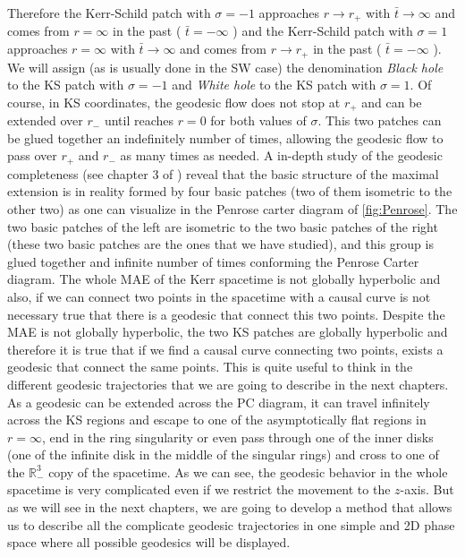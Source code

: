 Therefore the Kerr-Schild patch with $\sigma=-1$ approaches $r \to r_+$ with $\bar{t} \to \infty$ and comes from $r=\infty$ in the past ( $\bar t=-\infty$ ) and the Kerr-Schild patch  with $\sigma=1$ approaches $r=\infty$ with $\bar{t} \to \infty$ and comes from $r \to r_+$  in the past ( $\bar t=-\infty$ ). We will assign (as is usually done in the \gls{SW} case) the denomination  \textit{Black hole} to the \gls{KS} patch with $\sigma=-1$ and \textit{White hole} to the \gls{KS} patch with $\sigma=1$. Of course, in \gls{KS} coordinates, the geodesic flow does not stop at $r_+$ and can be extended over $r_-$ until reaches $r=0$ for both values of $\sigma$. This two patches can be glued together an indefinitely number of times, allowing the geodesic flow to pass over $r_+$ and $r_-$ as many times as needed. A in-depth study of the geodesic completeness (see chapter 3 of \cite{o1995geometry}) reveal that the basic structure of the maximal extension is in reality formed by four basic patches (two of them isometric to the other two) as one can visualize in the Penrose carter diagram of \cref{fig:Penrose}. The two basic patches of the left are isometric to the two basic patches of the right (these two basic patches are the ones that we have studied), and this group is glued together and infinite number of times conforming the Penrose Carter diagram. The whole \gls{MAE} of the Kerr spacetime is not globally hyperbolic and also, if we can connect two points in the spacetime with a causal curve is not necessary true that there is a geodesic that connect this two points. Despite the \gls{MAE} is not globally hyperbolic, the two \gls{KS} patches are globally hyperbolic and therefore it is true that if we find a causal curve connecting two points, exists a geodesic that connect the same points. This is quite useful to think in the different geodesic trajectories that we are going to describe in the next chapters. As a geodesic can be extended across the \gls{PC} diagram, it can travel infinitely across the \gls{KS} regions and escape to one of the asymptotically flat regions in $r=\infty$, end in the ring singularity or even pass through one of the inner disks (one of the infinite disk in the middle of the singular rings) and cross to one of the $\mathbb{R}_-^3$ copy of the spacetime. As we can see, the geodesic behavior in the whole spacetime is very complicated even if we restrict the movement to the $z$-axis. But as we will see in the next chapters, we are going to develop a method that allows us to describe all the complicate geodesic trajectories in one simple and 2D phase space where all possible geodesics will be displayed. 

